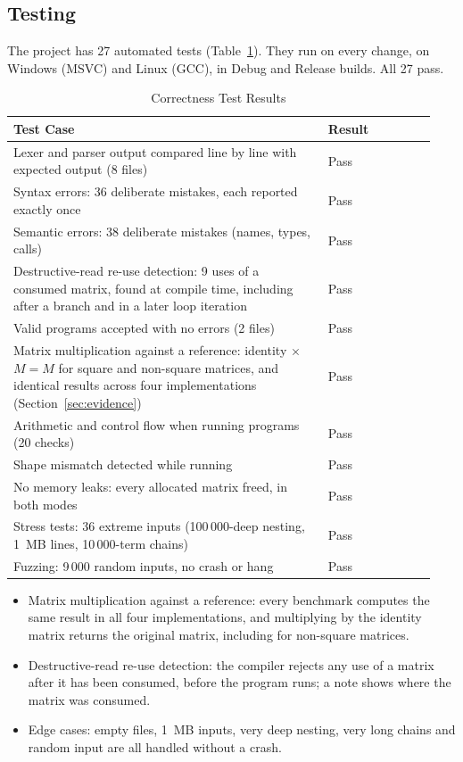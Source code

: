 \documentclass[a4paper]{article}
\begin{document}
	\subsection{Testing}

	The project has 27 automated tests (Table~\ref{tab:verification}). They run on every change, on Windows (MSVC) and Linux (GCC), in Debug and Release builds. All 27 pass.

	\begin{table}[h]
		\centering
		\caption{Correctness Test Results}
		\label{tab:verification}
		\begin{tabular}{@{}>{\RaggedRight}p{0.70\linewidth} >{\RaggedRight}p{0.24\linewidth}@{}}
			\toprule
			Test Case & Result \\
			\midrule
			Lexer and parser output compared line by line with expected output (8 files) & Pass \\
			Syntax errors: 36 deliberate mistakes, each reported exactly once & Pass \\
			Semantic errors: 38 deliberate mistakes (names, types, calls) & Pass \\
			Destructive-read re-use detection: 9 uses of a consumed matrix, found at compile time, including after a branch and in a later loop iteration & Pass \\
			Valid programs accepted with no errors (2 files) & Pass \\
			Matrix multiplication against a reference: identity $\times$ $M = M$ for square and non-square matrices, and identical results across four implementations (Section~\ref{sec:evidence}) & Pass \\
			Arithmetic and control flow when running programs (20 checks) & Pass \\
			Shape mismatch detected while running & Pass \\
			No memory leaks: every allocated matrix freed, in both modes & Pass \\
			Stress tests: 36 extreme inputs (100\,000-deep nesting, 1~MB lines, 10\,000-term chains) & Pass \\
			Fuzzing: 9\,000 random inputs, no crash or hang & Pass \\
			\bottomrule
		\end{tabular}
	\end{table}

	\begin{itemize}
		\item Matrix multiplication against a reference: every benchmark computes the same result in all four implementations, and multiplying by the identity matrix returns the original matrix, including for non-square matrices.
		\item Destructive-read re-use detection: the compiler rejects any use of a matrix after it has been consumed, before the program runs; a note shows where the matrix was consumed.
		\item Edge cases: empty files, 1~MB inputs, very deep nesting, very long chains and random input are all handled without a crash.
	\end{itemize}
	
\end{document}
